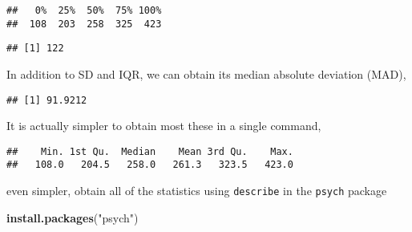 \documentclass[]{book}
\newenvironment{Shaded}{\begin{snugshade}}{\end{snugshade}}
\newcommand{\KeywordTok}[1]{\textcolor[rgb]{0.13,0.29,0.53}{\textbf{{#1}}}}
\newcommand{\DataTypeTok}[1]{\textcolor[rgb]{0.13,0.29,0.53}{{#1}}}
\newcommand{\DecValTok}[1]{\textcolor[rgb]{0.00,0.00,0.81}{{#1}}}
\newcommand{\StringTok}[1]{\textcolor[rgb]{0.31,0.60,0.02}{{#1}}}
\newcommand{\NormalTok}[1]{{#1}}
\theoremstyle{definition}
\theoremstyle{definition}
\theoremstyle{remark}
\begin{document}
\begin{verbatim}
##   0%  25%  50%  75% 100% 
##  108  203  258  325  423
\end{verbatim}

\begin{Shaded}
\end{Shaded}

\begin{verbatim}
## [1] 122
\end{verbatim}

In addition to SD and IQR, we can obtain its median absolute deviation
(MAD),

\begin{Shaded}
\end{Shaded}

\begin{verbatim}
## [1] 91.9212
\end{verbatim}

It is actually simpler to obtain most these in a single command,

\begin{Shaded}
\end{Shaded}

\begin{verbatim}
##    Min. 1st Qu.  Median    Mean 3rd Qu.    Max. 
##   108.0   204.5   258.0   261.3   323.5   423.0
\end{verbatim}

even simpler, obtain all of the statistics using \texttt{describe} in
the \texttt{psych} package

\begin{Shaded}
\begin{Highlighting}[]
\KeywordTok{install.packages}\NormalTok{(}\StringTok{"psych"}\NormalTok{)}
\end{Highlighting}
\end{Shaded}

\begin{Shaded}
\end{Shaded}
\end{document}

